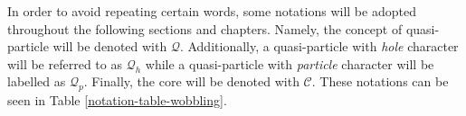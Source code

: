 In order to avoid repeating certain words, some notations will be adopted throughout the following sections and chapters. Namely, the concept of quasi-particle will be denoted with $\mathcal{Q}$. Additionally, a quasi-particle with \emph{hole} character will be referred to as $\mathcal{Q}_h$ while a quasi-particle with \emph{particle} character will be labelled as $\mathcal{Q}_p$. Finally, the core will be denoted with $\mathscr{C}$. These notations can be seen in Table \ref{notation-table-wobbling}.
\begin{table}
    \centering
    \caption{The notations adopted for describing wobbling motion in odd-$A$ nuclei by means of particles and angular momenta. These symbols will be used throughout the rest of the work.}
    \label{notation-table-wobbling}
\end{table}

